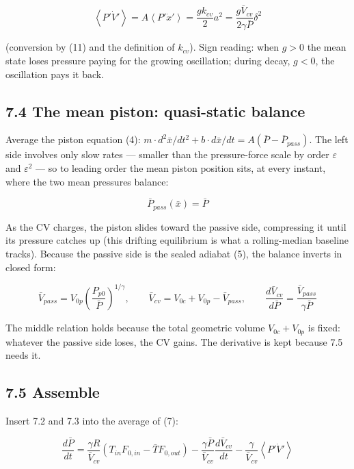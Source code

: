 \documentclass[11pt]{article}
\begin{document}
\begin{equation}
\left\langle P'\dot V'\right\rangle = A\left\langle P'\dot x'\right\rangle = \frac{gk_{cv}}{2}a^2 = \frac{g\bar V_{cv}}{2\gamma\bar P}\delta^2 \tag{24}
\end{equation}

(conversion by (11) and the definition of $k_{cv}$). Sign reading: when $g > 0$ the mean state loses pressure paying for the growing oscillation; during decay, $g < 0$, the oscillation pays it back.

\subsection*{7.4 The mean piston: quasi-static balance}

Average the piston equation (4): $m \cdot d^2\bar x/dt^2 + b \cdot d\bar x/dt = A(\bar P - \bar P_{pass})$. The left side involves only slow rates --- smaller than the pressure-force scale by order $\varepsilon$ and $\varepsilon^2$ --- so to leading order the mean piston position sits, at every instant, where the two mean pressures balance:

\[
\bar P_{pass}(\bar x) = \bar P
\]

As the CV charges, the piston slides toward the passive side, compressing it until its pressure catches up (this drifting equilibrium is what a rolling-median baseline tracks). Because the passive side is the sealed adiabat (5), the balance inverts in closed form:

\begin{equation}
\bar V_{pass} = V_{0p}\left(\frac{P_{p0}}{\bar P}\right)^{1/\gamma}, \qquad \bar V_{cv} = V_{0c} + V_{0p} - \bar V_{pass}, \qquad \frac{d\bar V_{cv}}{d\bar P} = \frac{\bar V_{pass}}{\gamma\bar P} \tag{25}
\end{equation}

The middle relation holds because the total geometric volume $V_{0c} + V_{0p}$ is fixed: whatever the passive side loses, the CV gains. The derivative is kept because 7.5 needs it.

\subsection*{7.5 Assemble}

Insert 7.2 and 7.3 into the average of (7):

\[
\frac{d\bar P}{dt} = \frac{\gamma R}{\bar V_{cv}}\left(T_{in}F_{0,in} - \bar TF_{0,out}\right) - \frac{\gamma\bar P}{\bar V_{cv}}\frac{d\bar V_{cv}}{dt} - \frac{\gamma}{\bar V_{cv}}\left\langle P'\dot V'\right\rangle
\]
\end{document}

